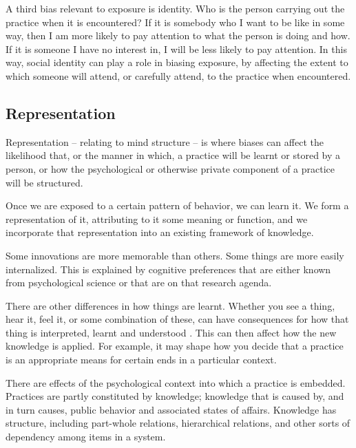 A third bias relevant to exposure is identity.  Who is the person carrying out the practice when 
it is encountered? If it is somebody who I want to be like in some 
way, then I am more likely to pay attention to what the person is doing 
and how. If it is someone I have no interest in, I will be less likely to pay attention. In this way, social 
identity can play a role in biasing exposure, by affecting the extent to 
which someone will attend, or carefully attend, to the practice when 
encountered.


\subsection{Representation}
Representation -- relating to mind structure -- is where biases can 
affect the likelihood that, or the manner in which, a practice will be 
learnt or stored by a person, or how the psychological or otherwise 
private component of a practice will be structured. 



Once we are exposed to a certain pattern of behavior, we can 
learn it. We form a representation of it, attributing to it some meaning 
or function, and we incorporate that representation into an existing framework of knowledge. 



Some innovations are more memorable than others. Some things are more easily internalized. This is explained by cognitive preferences that are either known from 
psychological science or that are on that research agenda. 



There are other differences in how things are learnt. Whether you see a thing, hear it, feel it, or some combination of these, can have 
consequences for how that thing is interpreted, learnt and understood 
\citep[Chapter 6]{enfield_anatomy_2009}. This can then affect how the new knowledge is applied. For example, it may shape how you decide that a practice 
is an appropriate means for certain ends in a particular context.



There are effects of the psychological context into which a practice is 
embedded. Practices are partly constituted by knowledge; knowledge that 
is caused by, and in turn causes, public behavior and associated states 
of affairs. Knowledge has structure, including part-whole relations, hierarchical 
relations, and other sorts of dependency among items in a system. 



